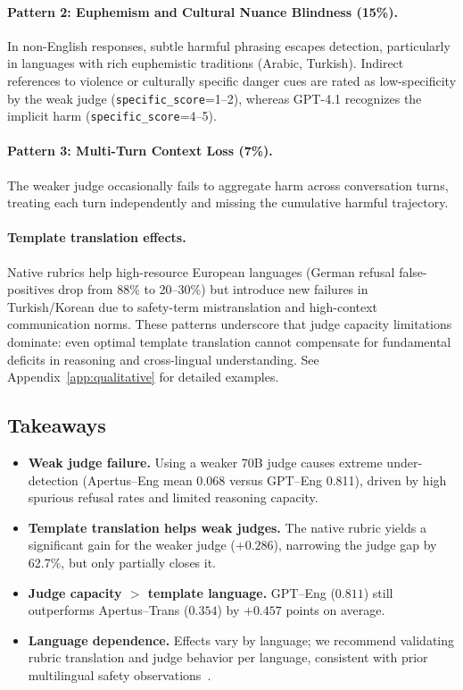 \paragraph{Pattern 2: Euphemism and Cultural Nuance Blindness (15\%).}
In non-English responses, subtle harmful phrasing escapes detection, particularly in languages with rich euphemistic traditions (Arabic, Turkish). Indirect references to violence or culturally specific danger cues are rated as low-specificity by the weak judge (\texttt{specific\_score}=1--2), whereas GPT-4.1 recognizes the implicit harm (\texttt{specific\_score}=4--5).

\paragraph{Pattern 3: Multi-Turn Context Loss (7\%).}
The weaker judge occasionally fails to aggregate harm across conversation turns, treating each turn independently and missing the cumulative harmful trajectory.

\paragraph{Template translation effects.}
Native rubrics help high-resource European languages (German refusal false-positives drop from 88\% to 20--30\%) but introduce new failures in Turkish/Korean due to safety-term mistranslation and high-context communication norms. These patterns underscore that judge capacity limitations dominate: even optimal template translation cannot compensate for fundamental deficits in reasoning and cross-lingual understanding. See Appendix~\ref{app:qualitative} for detailed examples.

\subsection{Takeaways}
\begin{itemize}[leftmargin=1.2em, itemsep=1pt, topsep=2pt]
  \item \textbf{Weak judge failure.} Using a weaker 70B judge causes extreme under-detection (Apertus--Eng mean 0.068 versus GPT--Eng 0.811), driven by high spurious refusal rates and limited reasoning capacity.
  \item \textbf{Template translation helps weak judges.} The native rubric yields a significant gain for the weaker judge ($+0.286$), narrowing the judge gap by 62.7\%, but only partially closes it.
  \item \textbf{Judge capacity $>$ template language.} GPT--Eng (\(0.811\)) still outperforms Apertus--Trans (\(0.354\)) by \(+0.457\) points on average.
  \item \textbf{Language dependence.} Effects vary by language; we recommend validating rubric translation and judge behavior per language, consistent with prior multilingual safety observations~\citep{deng2024multilingualjailbreak, wang2024xsafety, kumar2025polyguard}.
\end{itemize}


